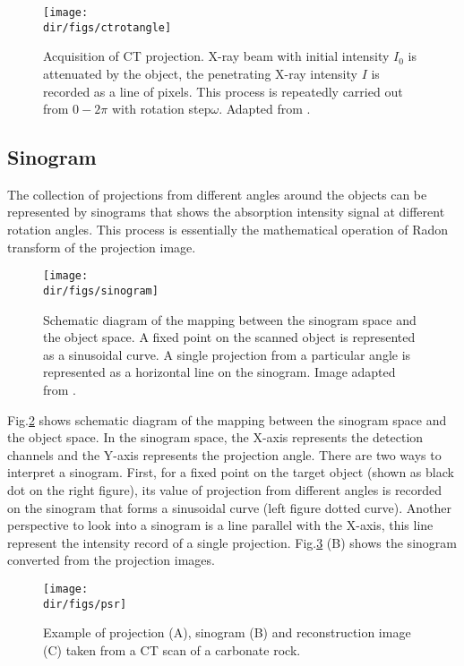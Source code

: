 \begin{figure}[htbp]
  \centering
  \texttt{[image: \\dir/figs/ctrotangle]}
  \caption{Acquisition of CT projection. X-ray beam with initial intensity $I_0$ is attenuated by the object, the penetrating X-ray intensity $I$ is recorded as a line of pixels. This process is repeatedly carried out from $0-2\pi$ with rotation step$\omega$. Adapted from \citet{fusseis2014low}.}
  \label{ctrotangle}
\end{figure}

\subsection{Sinogram}
The collection of projections from different angles around the objects can be represented by sinograms that shows the absorption intensity signal at different rotation angles. This process is essentially the mathematical operation of Radon transform \citep{radon20051} of the projection image. 

\begin{figure}[htbp]
  \centering
  \texttt{[image: \\dir/figs/sinogram]}
  \caption{Schematic diagram of the mapping between the sinogram space and the object space. A fixed point on the scanned object is represented as a sinusoidal curve. A single projection from a particular angle is represented as a horizontal line on the sinogram. Image adapted from \citep{hsieh2003computed}.}
  \label{sinogram}
\end{figure}

Fig.\ref{sinogram} shows schematic diagram of the mapping between the sinogram space and the object space. In the sinogram space, the X-axis represents the detection channels and the Y-axis represents the projection angle. There are two ways to interpret a sinogram. First, for a fixed point on the target object (shown as black dot on the right figure), its value of projection from different angles is recorded on the sinogram that forms a sinusoidal curve (left figure dotted curve). Another perspective to look into a sinogram is a line parallel with the X-axis, this line represent the intensity record of a single projection. Fig.\ref{psr} (B) shows the sinogram converted from the projection images. 

\begin{figure}[htbp]
  \centering
  \texttt{[image: \\dir/figs/psr]}
  \caption{Example of projection (A), sinogram (B) and reconstruction image (C) taken from a CT scan of a carbonate rock. \citep{Pak2014thesis}}
  \label{psr}
\end{figure}

